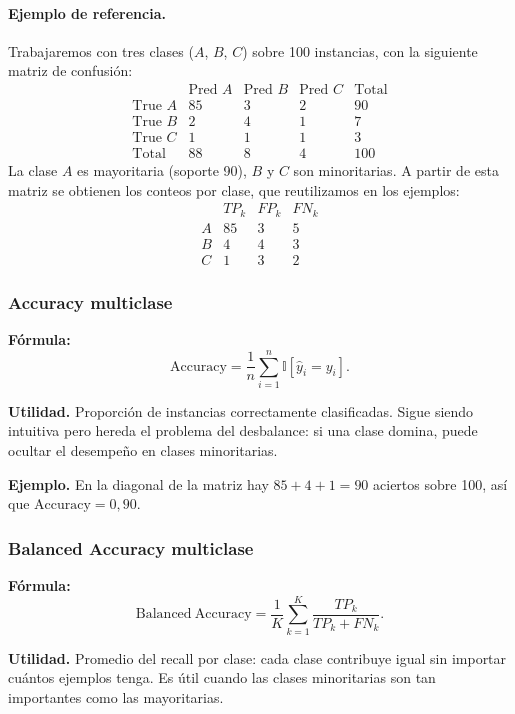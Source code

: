 \documentclass[12pt,oneside]{report}
\newcommand{\ind}{\mathbb{I}} %
\begin{document}
\paragraph{Ejemplo de referencia.} Trabajaremos con tres clases ($A$,
$B$, $C$) sobre 100 instancias, con la siguiente matriz de confusión:
\[
\begin{array}{l|ccc|c}
 & \text{Pred }A & \text{Pred }B & \text{Pred }C & \text{Total} \\
\hline
\text{True }A & 85 & 3 & 2 & 90 \\
\text{True }B & 2  & 4 & 1 & 7  \\
\text{True }C & 1  & 1 & 1 & 3  \\
\hline
\text{Total} & 88 & 8 & 4 & 100
\end{array}
\]
La clase $A$ es mayoritaria (soporte 90), $B$ y $C$ son minoritarias.
A partir de esta matriz se obtienen los conteos por clase, que
reutilizamos en los ejemplos:
\[
\begin{array}{l|ccc}
 & TP_k & FP_k & FN_k \\
\hline
A & 85 & 3 & 5 \\
B & 4  & 4 & 3 \\
C & 1  & 3 & 2
\end{array}
\]

\subsubsection{Accuracy multiclase}

\textbf{Fórmula:}
\[
\mathrm{Accuracy}=\frac{1}{n}\sum_{i=1}^{n}\ind[\hat y_i=y_i].
\]

\textbf{Utilidad.} Proporción de instancias correctamente clasificadas.
Sigue siendo intuitiva pero hereda el problema del desbalance: si una
clase domina, puede ocultar el desempeño en clases minoritarias.

\textbf{Ejemplo.} En la diagonal de la matriz hay $85+4+1=90$ aciertos
sobre 100, así que $\mathrm{Accuracy}=0{,}90$.

\subsubsection{Balanced Accuracy multiclase}

\textbf{Fórmula:}
\[
\mathrm{Balanced\ Accuracy}=\frac{1}{K}\sum_{k=1}^{K}\frac{TP_k}{TP_k+FN_k}.
\]

\textbf{Utilidad.} Promedio del recall por clase: cada clase contribuye
igual sin importar cuántos ejemplos tenga. Es útil cuando las clases
minoritarias son tan importantes como las mayoritarias.
\end{document}
